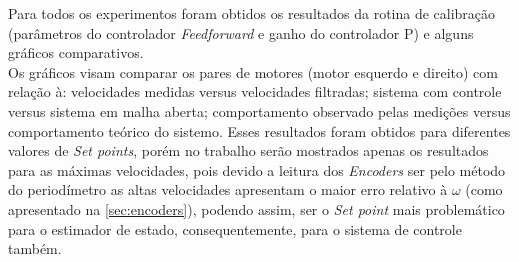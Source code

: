 Para todos os experimentos foram obtidos os resultados da rotina de calibração (parâmetros do controlador \emph{Feedforward} e ganho do controlador P) e alguns gráficos comparativos. \\

Os gráficos visam comparar os pares de motores (motor esquerdo e direito) com relação à: velocidades medidas versus velocidades filtradas; sistema com controle versus sistema em malha aberta; comportamento observado pelas medições versus comportamento teórico do sistemo. Esses resultados foram obtidos para diferentes valores de \emph{Set points}, porém no trabalho serão mostrados apenas os resultados para as máximas velocidades, pois devido a leitura dos \emph{Encoders} ser pelo método do periodímetro as altas velocidades apresentam o maior erro relativo à $\omega$ (como apresentado na \autoref{sec:encoders}), podendo assim, ser o \emph{Set point} mais problemático para o estimador de estado, consequentemente, para o sistema de controle também.\\




